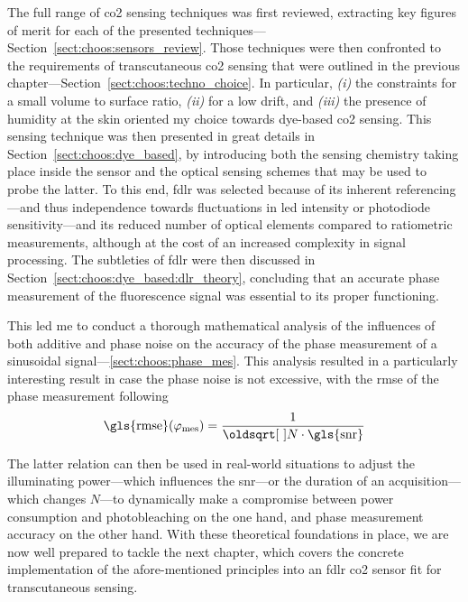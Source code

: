 The full range of \gls{co2} sensing techniques was first reviewed, extracting key figures of merit for each of the presented techniques---Section~\ref{sect:choos:sensors_review}. Those techniques were then confronted to the requirements of transcutaneous \gls{co2} sensing that were outlined in the previous chapter---Section~\ref{sect:choos:techno_choice}. In particular, \textit{(i)} the constraints for a small volume to surface ratio, \textit{(ii)} for a low drift, and \textit{(iii)} the presence of humidity at the skin oriented my choice towards dye-based \gls{co2} sensing. This sensing technique was then presented in great details in Section~\ref{sect:choos:dye_based}, by introducing both the sensing chemistry taking place inside the sensor and the optical sensing schemes that may be used to probe the latter. To this end, \gls{fdlr} was selected because of its inherent referencing---and thus independence towards fluctuations in \gls{led} intensity or photodiode sensitivity---and its reduced number of optical elements compared to ratiometric measurements, although at the cost of an increased complexity in signal processing. The subtleties of \gls{fdlr} were then discussed in Section~\ref{sect:choos:dye_based:dlr_theory}, concluding that an accurate phase measurement of the fluorescence signal was essential to its proper functioning.

This led me to conduct a thorough mathematical analysis of the influences of both additive and phase noise on the accuracy of the phase measurement of a sinusoidal signal---\ref{sect:choos:phase_mes}. This analysis resulted in a particularly interesting result in case the phase noise is not excessive, with the \gls{rmse} of the phase measurement following
\begin{equation}
	\text{\gls{rmse}}(\varphi_\text{mes}) = \frac{1}{\sqrt{N \cdot \text{\gls{snr}}}}
\end{equation}

The latter relation can then be used in real-world situations to adjust the illuminating power---which influences the \gls{snr}---or the duration of an acquisition---which changes $N$---to dynamically make a compromise between power consumption and photobleaching on the one hand, and phase measurement accuracy on the other hand. With these theoretical foundations in place, we are now well prepared to tackle the next chapter, which covers the concrete implementation of the afore-mentioned principles into an \gls{fdlr} \gls{co2} sensor fit for transcutaneous sensing.
